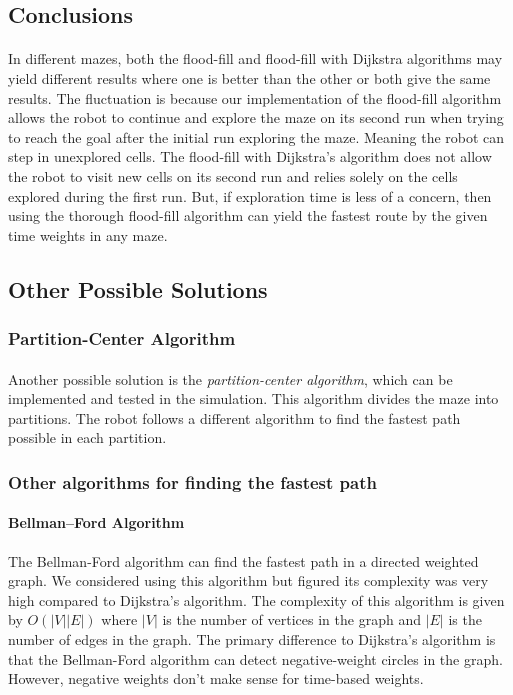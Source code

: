 \documentclass[12pt]{article}
\begin{document}
\subsection{Conclusions}
\paragraph{}
In different \gls{maze}s, both the flood-fill and flood-fill with Dijkstra algorithms may yield different results where one is better than the other or both give the same results.
The fluctuation is because our implementation of the flood-fill algorithm allows the robot to continue and explore the \gls{maze} on its second run when trying to reach the goal after the initial run exploring the \gls{maze}.
Meaning the robot can step in unexplored \gls{cell}s.
The flood-fill with Dijkstra's algorithm does not allow the robot to visit new \gls{cell}s on its second run and relies solely on the \gls{cell}s explored during the first run.
But, if exploration time is less of a concern, then using the thorough flood-fill algorithm can yield the fastest route by the given time weights in any \gls{maze}.

\subsection{Other Possible Solutions}
\subsubsection{Partition-Center Algorithm}
\paragraph{}
Another possible solution is the \textit{partition-center algorithm}, which can be implemented and tested in the simulation.
This algorithm divides the \gls{maze} into partitions.
The robot follows a different algorithm to find the fastest path possible \cite{5497446} in each partition.

\subsubsection{Other algorithms for finding the fastest path}
\paragraph{Bellman–Ford Algorithm}
The Bellman-Ford algorithm can find the fastest path in a directed weighted \gls{graph}.
We considered using this algorithm but figured its complexity was very high compared to Dijkstra's algorithm.
The complexity of this algorithm is given by $O(|V||E|)$ where $|V|$ is the number of vertices in the \gls{graph} and $|E|$ is the number of edges in the \gls{graph}.
The primary difference to Dijkstra's algorithm is that the Bellman-Ford algorithm can detect negative-weight circles in the \gls{graph}.
However, negative weights don't make sense for time-based weights.
\end{document}
